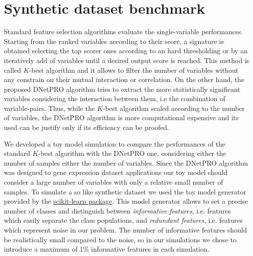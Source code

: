 \documentclass{standalone}
\begin{document}
\section[Toy Model]{Synthetic dataset benchmark}\label{dnetpro:toy}

Standard feature selection algorithms evaluate the single-variable performances.
Starting from the ranked variables according to their score, a signature is obtained selecting the top scorer ones according to an hard thresholding or by an iteratively add of variables until a desired output score is reached.
This method is called $K$-best algorithm and it allows to filter the number of variables without any constrain on their mutual interaction or correlation.
On the other hand, the proposed DNetPRO algorithm tries to extract the more statistically significant variables considering the interaction between them, i.e the combination of variable-pairs.
Thus, while the $K$-best algorithm scaled according to the number of variables, the DNetPRO algorithm is more computational expensive and its used can be justify only if its efficiency can be proofed.

We developed a toy model simulation to compare the performances of the standard $K$-best algorithm with the DNetPRO one, considering either the number of samples either the number of variables.
Since the DNetPRO algorithm was designed to gene expression dataset applications our toy model should consider a large number of variables with only a relative small number of samples.
To simulate a so like synthetic dataset we used the toy model generator provided by the \href{https://scikit-learn.org/stable/modules/generated/sklearn.datasets.make_classification.html}{scikit-learn package}.
This model generator allows to set a precise number of classes and distinguish between \emph{informative features}, i.e. features which easily separate the class populations, and \emph{redundant features}, i.e. features which represent noise in our problem.
The number of informative features should be realistically small compared to the noise, so in our simulations we chose to introduce a maximum of 1\% informative features in each simulation.
\end{document}
